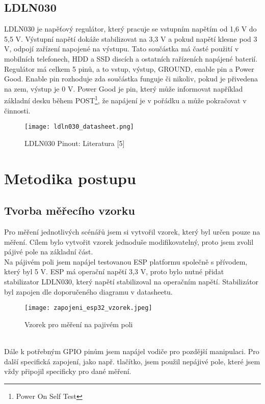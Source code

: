 \documentclass[a4paper, 12pt]{report}
\begin{document}
			\section{LDLN030}
			LDLN030 je napěťový regulátor, který pracuje se vstupním napětím od 1,6 V do 5,5 V. Výstupní napětí dokáže stabilizovat na 3,3 V a pokud napětí klesne pod 3 V, odpojí zařízení napojené na výstupu. Tato součástka má časté použití v mobilních telefonech, HDD a SSD discích a ostatních rařízeních napájené baterií. \\
			Regulátor má celkem 5 pinů, a to vstup, výstup, GROUND, enable pin a Power Good. Enable pin rozhoduje zda součástka funguje či nikoliv, pokud je přivedena na zem, výstup je 0 V. Power Good je pin, který může informovat například základní desku během POST\footnote{Power On Self Test}, že napájení je v pořádku a může pokračovat v činnosti.
			\begin{figure}[h]
				\centering
				\texttt{[image: ldln030\_datasheet.png]}
				\caption{LDLN030 Pinout: Literatura [5]}
				\label{ldln030_datasheet}
			\end{figure}


	\chapter{Metodika postupu}
		\section{Tvorba měřecího vzorku}
			Pro měření jednotlivých scénářů jsem si vytvořil vzorek, který byl určen pouze na měření. Cílem bylo vytvořit vzorek jednoduše modifikovatelný, proto jsem zvolil pájivé pole na základní část.\\
			Na pájivém poli jsem napájel testovanou ESP platformu společně s přívodem, který byl 5 V. ESP má operační napětí 3,3 V, proto bylo nutné přidat stabilizator LDLN030, který napětí stabilizoval na operačním napětí. Stabilizátor byl zapojen dle doporučeného diagramu v datasheetu.
			\begin{figure}[h]
				\centering
				\texttt{[image: zapojeni\_esp32\_vzorek.jpeg]}
				\caption{Vzorek pro měření na pajivém poli}
				\label{zapojeni_esp32_vzorek}
			\end{figure}
			\\
			Dále k potřebným GPIO pinům jsem napájel vodiče pro pozdější manipulaci. Pro další specifická zapojení, jako např. tlačítko, jsem použil nepájivé pole, které jsem vždy připojil specificky pro dané měření.
\end{document}
